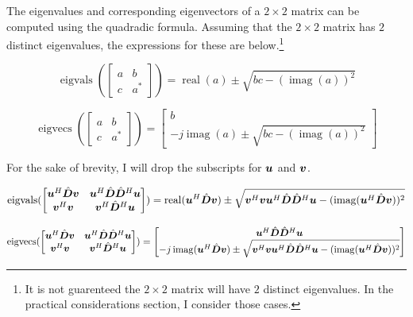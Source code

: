 The eigenvalues and corresponding eigenvectors of a $2 \times 2$ matrix can be computed using the quadradic formula. Assuming that the $2 \times 2$ matrix has $2$ distinct eigenvalues, the expressions for these are below.\footnote{It is not guarenteed the $2 \times 2$ matrix will have $2$ distinct eigenvalues. In the practical considerations section, I consider those cases.}

\begin{equation}
\operatorname{eigvals}(\begin{bmatrix} a & b \\ c & a^* \end{bmatrix}) = \operatorname{real}(a) \pm \sqrt{bc - (\operatorname{imag}(a))^2}
\end{equation}

\begin{equation}
\operatorname{eigvecs}(\begin{bmatrix} a & b \\ c & a^* \end{bmatrix}) = \begin{bmatrix} b \\ -j\operatorname{imag}(a) \pm \sqrt{bc - (\operatorname{imag}(a))^2}\end{bmatrix}
\end{equation}

For the sake of brevity, I will drop the subscripts for $\bm{u}$ and $\bm{v}$.

\begin{equation}
\operatorname{eigvals}(\begin{bmatrix}
\bm{u}^H\hat{\bm{D}}\bm{v} & \bm{u}^H\hat{\bm{D}}\hat{\bm{D}}^H\bm{u} \\
\bm{v}^H\bm{v}    & \bm{v}^H\hat{\bm{D}}^H\bm{u}
\end{bmatrix})
= \operatorname{real}(\bm{u}^H\hat{\bm{D}}\bm{v}) \pm \sqrt{\bm{v}^H\bm{v}\bm{u}^H\hat{\bm{D}}\hat{\bm{D}}^H\bm{u} - (\operatorname{imag}(\bm{u}^H\hat{\bm{D}}\bm{v}))^2}
\end{equation}

\begin{equation}
\operatorname{eigvecs}
(\begin{bmatrix}
\bm{u}^H\hat{\bm{D}}\bm{v} & \bm{u}^H\hat{\bm{D}}\hat{\bm{D}}^H\bm{u} \\
\bm{v}^H\bm{v}    & \bm{v}^H\hat{\bm{D}}^H\bm{u}
\end{bmatrix})
= \begin{bmatrix}
\bm{u}^H\hat{\bm{D}}\hat{\bm{D}}^H\bm{u} \\
-j\operatorname{imag}(\bm{u}^H\hat{\bm{D}}\bm{v}) \pm \sqrt{\bm{v}^H\bm{v}\bm{u}^H\hat{\bm{D}}\hat{\bm{D}}^H\bm{u} - (\operatorname{imag}(\bm{u}^H\hat{\bm{D}}\bm{v}))^2}
\end{bmatrix}
\end{equation}

